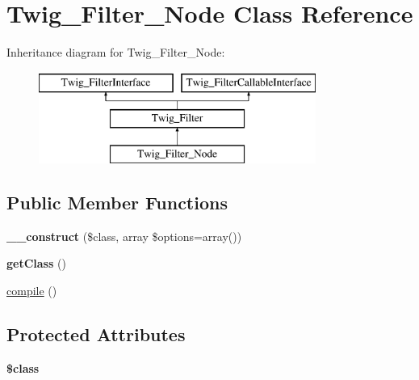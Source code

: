 \hypertarget{class_twig___filter___node}{}\section{Twig\+\_\+\+Filter\+\_\+\+Node Class Reference}
\label{class_twig___filter___node}
Inheritance diagram for Twig\+\_\+\+Filter\+\_\+\+Node\+:\begin{figure}[H]
\begin{center}
\leavevmode
\includegraphics[height=3.000000cm]{class_twig___filter___node}
\end{center}
\end{figure}
\subsection*{Public Member Functions}
\begin{DoxyCompactItemize}
\item 
\hypertarget{class_twig___filter___node_ad54af67e0f4e88a0c80d60b51380a48e}{}{\bfseries \+\_\+\+\_\+construct} (\$class, array \$options=array())\label{class_twig___filter___node_ad54af67e0f4e88a0c80d60b51380a48e}

\item 
\hypertarget{class_twig___filter___node_a23ecbde357f7f6bde5a50f876334a74d}{}{\bfseries get\+Class} ()\label{class_twig___filter___node_a23ecbde357f7f6bde5a50f876334a74d}

\item 
\hyperlink{class_twig___filter___node_a3815e7c2e73f00c2ebffcf5b90eef3b1}{compile} ()
\end{DoxyCompactItemize}
\subsection*{Protected Attributes}
\begin{DoxyCompactItemize}
\item 
\hypertarget{class_twig___filter___node_a252ba022809910ea710a068fc1bab657}{}{\bfseries \$class}\label{class_twig___filter___node_a252ba022809910ea710a068fc1bab657}

\end{DoxyCompactItemize}



